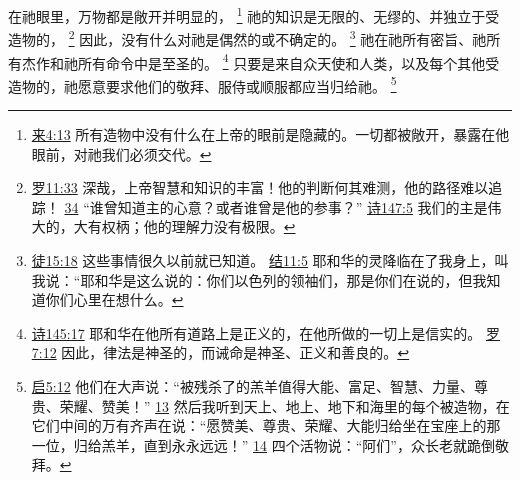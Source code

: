 \documentclass[12pt, a4paper, oneside]{ctexart}
\begin{document}
	在祂眼里，万物都是敞开并明显的，
	\footnote {
		\href{https://biblehub.com/hebrews/4-13.htm}{来4:13} 所有造物中没有什么在上帝的眼前是隐藏的。一切都被敞开，暴露在他眼前，对祂我们必须交代。
	}
	祂的知识是无限的、无缪的、并独立于受造物的，
	\footnote {
		\href{https://biblehub.com/romans/11-33.htm}{罗11:33} 深哉，上帝智慧和知识的丰富！他的判断何其难测，他的路径难以追踪！
		\href{https://biblehub.com/romans/11-34.htm}{34} “谁曾知道主的心意？或者谁曾是他的参事？”
		\href{https://biblehub.com/psalms/147-5.htm}{诗147:5} 我们的主是伟大的，大有权柄；他的理解力没有极限。
	}
	因此，没有什么对祂是偶然的或不确定的。
	\footnote {
		\href{https://biblehub.com/acts/15-18.htm}{徒15:18} 这些事情很久以前就已知道。
		\href{https://biblehub.com/ezekiel/11-5.htm}{结11:5} 耶和华的灵降临在了我身上，叫我说：“耶和华是这么说的：你们以色列的领袖们，那是你们在说的，但我知道你们心里在想什么。
	}
	祂在祂所有密旨、祂所有杰作和祂所有命令中是至圣的。
	\footnote {
		\href{https://biblehub.com/psalms/145-17.htm}{诗145:17} 耶和华在他所有道路上是正义的，在他所做的一切上是信实的。
		\href{https://biblehub.com/romans/7-12.htm}{罗7:12} 因此，律法是神圣的，而诫命是神圣、正义和善良的。
	}
	只要是来自众天使和人类，以及每个其他受造物的，祂愿意要求他们的敬拜、服侍或顺服都应当归给祂。
	\footnote {
		\href{https://biblehub.com/revelation/5-12.htm}{启5:12} 他们在大声说：“被残杀了的羔羊值得大能、富足、智慧、力量、尊贵、荣耀、赞美！”
		\href{https://biblehub.com/revelation/5-13.htm}{13} 然后我听到天上、地上、地下和海里的每个被造物，在它们中间的万有齐声在说：“愿赞美、尊贵、荣耀、大能归给坐在宝座上的那一位，归给羔羊，直到永永远远！”
		\href{https://biblehub.com/revelation/5-14.htm}{14} 四个活物说：“阿们”，众长老就跪倒敬拜。
	}
	
\end{document}
